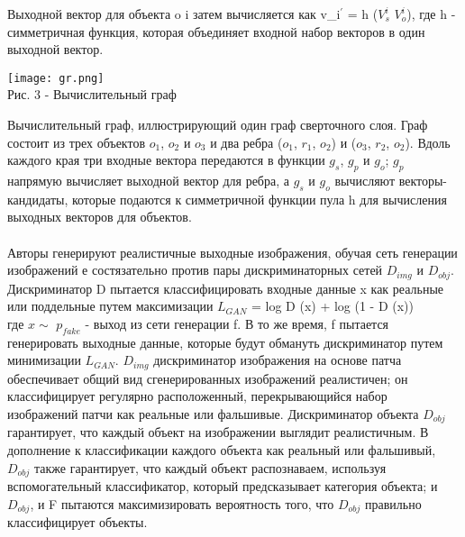 \documentclass{article}
\begin{document}
Выходной вектор для объекта o i затем вычисляется как
$ $v_{i}$^\prime$ = h ($V^i_{s} $ \bigcup  $V^i_{o} $), где h - симметричная функция, которая
объединяет входной набор векторов в один выходной вектор.\\
  \begin{center} 
  \texttt{[image: gr.png]}
  \\
  \caption*{Рис. 3 - Вычислительный граф}
  \end{center} 
  \large Вычислительный граф, иллюстрирующий один граф сверточного слоя. Граф состоит из трех объектов $o_{1}$, $o_{2}$ и $o_{3}$ и
два ребра ($o_{1}$, $r_{1}$, $o_{2}$) и ($o_{3}$, $r_{2}$, $o_{2}$). Вдоль каждого края три
входные вектора передаются в функции $g_{s}$, $g_{p}$ и $g_{o}$; $g_{p}$ напрямую
вычисляет выходной вектор для ребра, а $g_{s}$ и $g_{o}$ вычисляют
векторы-кандидаты, которые подаются к симметричной функции пула
h для вычисления выходных векторов для объектов.\\ \\
Авторы генерируют реалистичные выходные изображения,
обучая сеть генерации изображений е состязательно
против пары дискриминаторных сетей $D_{img}$ и $D_{obj}$.
Дискриминатор D пытается классифицировать входные данные x как реальные
или поддельные путем максимизации $L_{GAN}$ =  log D (x) +  log (1 - D (x))\\
где $x\sim$ $p_{fake}$ - выход из сети генерации f.
В то же время, f пытается генерировать выходные данные, которые будут
обмануть дискриминатор путем минимизации $L_{GAN}$.
$D_{img}$ дискриминатор изображения на основе патча обеспечивает
общий вид сгенерированных изображений реалистичен;
он классифицирует регулярно расположенный, перекрывающийся набор изображений
патчи как реальные или фальшивые.
Дискриминатор объекта $D_{obj}$ гарантирует, что каждый объект
на изображении выглядит реалистичным. В дополнение к классификации каждого объекта как
реальный или фальшивый, $D_{obj}$ также гарантирует, что каждый объект распознаваем, используя вспомогательный классификатор, который предсказывает
категория объекта; и $D_{obj}$, и F пытаются максимизировать
вероятность того, что $D_{obj}$ правильно классифицирует объекты.\\ \\
\end{document}
